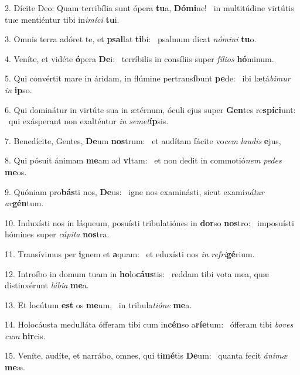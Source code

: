 2. Dícite Deo: Quam terribília sunt ópera \textbf{tu}a, \textbf{Dó}\textbf{mi}ne! \ast\  in multitúdine virtútis tuæ mentiéntur tibi in\textit{i}\textit{mí}\textit{ci} \textbf{tu}i.\

3. Omnis terra adóret te, et \textbf{psal}lat \textbf{ti}bi: \ast\  psalmum dicat \textit{nó}\textit{mi}\textit{ni} \textbf{tu}o.\

4. Veníte, et vidéte \textbf{ó}pera \textbf{De}i: \ast\  terríbilis in consíliis super \textit{fí}\textit{li}\textit{os} \textbf{hó}minum.\

5. Qui convértit mare in áridam, in flúmine pertrans\textbf{í}bunt \textbf{pe}de: \ast\  ibi lætá\textit{bi}\textit{mur} \textit{in} \textbf{ip}so.\

6. Qui dominátur in virtúte sua in ætérnum, óculi ejus super \textbf{Gen}tes re\textbf{spí}\textbf{ci}unt: \ast\  qui exásperant non exalténtur \textit{in} \textit{se}\textit{met}\textbf{íp}sis.\

7. Benedícite, Gentes, \textbf{De}um \textbf{nos}trum: \ast\  et audítam fácite vo\textit{cem} \textit{lau}\textit{dis} \textbf{e}jus,\

8. Qui pósuit ánimam \textbf{me}am ad \textbf{vi}tam: \ast\  et non dedit in commotió\textit{nem} \textit{pe}\textit{des} \textbf{me}os.\

9. Quóniam pro\textbf{bás}ti nos, \textbf{De}us: \ast\  igne nos examinásti, sicut exami\textit{ná}\textit{tur} \textit{ar}\textbf{gén}tum.\

10. Induxísti nos in láqueum, posuísti tribulatiónes in \textbf{dor}so \textbf{nos}tro: \ast\  imposuísti hómines super \textit{cá}\textit{pi}\textit{ta} \textbf{nos}tra.\

11. Transívimus per \textbf{i}gnem et \textbf{a}quam: \ast\  et eduxísti nos \textit{in} \textit{re}\textit{fri}\textbf{gé}rium.\

12. Introíbo in domum tuam in \textbf{ho}lo\textbf{cáus}tis: \ast\  reddam tibi vota mea, quæ distinxérunt \textit{lá}\textit{bi}\textit{a} \textbf{me}a.\

13. Et locútum \textbf{est} os \textbf{me}um, \ast\  in tribula\textit{ti}\textit{ó}\textit{ne} \textbf{me}a.\

14. Holocáusta medulláta ófferam tibi cum in\textbf{cén}so a\textbf{rí}\textbf{e}tum: \ast\  ófferam tibi \textit{bo}\textit{ves} \textit{cum} \textbf{hir}cis.\

15. Veníte, audíte, et narrábo, omnes, qui ti\textbf{mé}tis \textbf{De}um: \ast\  quanta fecit \textit{á}\textit{ni}\textit{mæ} \textbf{me}æ.\

